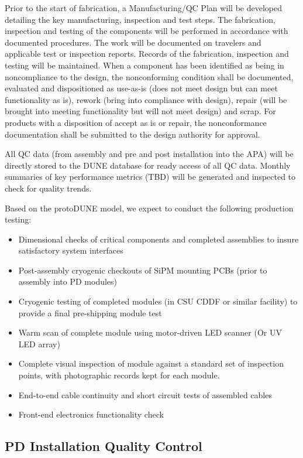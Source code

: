 Prior to the start of fabrication, a Manufacturing/QC Plan will be developed detailing the key manufacturing, inspection and test steps.  The fabrication, inspection and testing of the components will be performed in accordance with documented procedures. The work will be documented on travelers and applicable test or inspection reports. Records of the fabrication, inspection and testing will be maintained. When a component has been identified as being in noncompliance to the design, the nonconforming condition shall be documented, evaluated and dispositioned as use-as-is (does not meet design but can meet functionality as is), rework (bring into compliance with design), repair (will be brought into meeting functionality but will not meet design) and scrap. For products with a disposition of accept as is or repair, the nonconformance documentation shall be submitted to the design authority for approval.   

All QC data  (from assembly and pre and post installation into the APA) will be directly stored to the DUNE database for ready access of all QC data.  Monthly summaries of key performance metrics (TBD) will be generated and inspected to check for quality trends.

Based on the protoDUNE model, we expect to conduct the following production testing:
\begin{itemize}
\item Dimensional checks of critical components and completed assemblies to insure satisfactory system interfaces
\item Post-assembly cryogenic checkouts of SiPM mounting PCBs (prior to assembly into PD modules)
\item Cryogenic testing of completed modules (in CSU CDDF or similar facility) to provide a final pre-shipping module test
\item Warm scan of complete module using motor-driven LED scanner (Or UV LED array)
\item Complete visual inspection of module against a standard set of inspection points, with photographic records kept for each module.
\item End-to-end cable continuity and short circuit tests of assembled cables
\item Front-end electronics functionality check
\end{itemize}

\subsection{PD Installation Quality Control}
\label{sec:fdsp-pd-prodqc}

